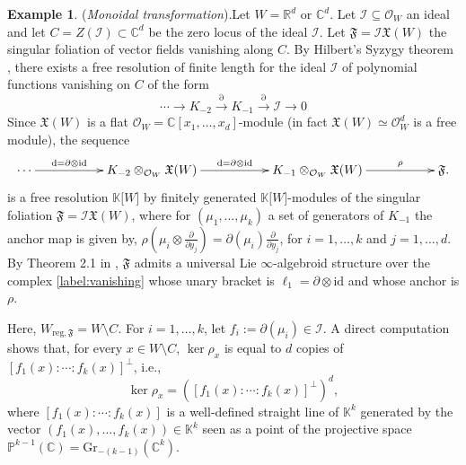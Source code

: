 \documentclass[10pt]{article}
\theoremstyle{plain}
\theoremstyle{definition}
\newtheorem{example}[lemma]{Example}
\theoremstyle{remark}
\newcommand{\dd}{\mathrm{d}}
\begin{document}
\begin{example}(\emph{Monoidal transformation}).\label{Monoidal}
Let $W=\mathbb R^d$ or $\mathbb C^d$. Let $\mathcal{I}\subseteq \mathcal{O}_W$ an ideal and let  $C=Z(\mathcal{I})\subset \mathbb C^d$ be the zero locus of the ideal $\mathcal I$. Let $\mathfrak{F}=\mathcal{I}\mathfrak{X}(W)$ the singular foliation of vector fields vanishing along $C$. By Hilbert’s Syzygy theorem \cite{EisenbudSyzygies},
there exists a free resolution {of finite length} for the ideal $\mathcal I$ of polynomial functions  vanishing on $C$  of the form\begin{equation}\label{label:vanishing1}
    \cdots \longrightarrow K_{-2}\stackrel{\partial}{\longrightarrow}K_{-1}\stackrel{\partial}{\longrightarrow}\mathcal{I}\longrightarrow 0
\end{equation} Since $\mathfrak{X}(W)$ is a flat $\mathcal O_W=\mathbb C[x_1, \ldots, x_d]$-module (in fact $\mathfrak X(W)\simeq \mathcal O_W^d$ is a free module),  the sequence \begin{equation}\label{label:vanishing}
\xymatrix{\cdots\ar[rr]^-{\dd=\partial\otimes\text{id}} & & K_{-2} \otimes_{\mathcal O_W} {\mathfrak{X}(W)} \ar^{\dd=\partial\otimes \text{id}}[rr]& & K_{-1}\otimes_{\mathcal O_W}\mathfrak{X}(W)\ar^-\rho[rr] & & \mathfrak{F}.
}\end{equation} is a free resolution $\mathbb{K}\mathbb[W]$ by finitely generated $\mathbb{K}\mathbb[W]$-modules of the singular foliation $\mathfrak{F}=\mathcal I\mathfrak{X}(W)$, where for $(\mu_1, \ldots, \mu_k)$ a set of generators of $K_{-1}$ the anchor map is given by, $\rho(\mu_i\otimes \frac{\partial}{\partial y_j})= \partial (\mu_i)\frac{\partial}{\partial y_j}$, for $i=1,\ldots,k$ and $j=1, \ldots, d$. By Theorem 2.1 in \cite{CLRL},  $\mathfrak{F}$ admits a universal Lie $\infty$-algebroid structure over the complex \eqref{label:vanishing} whose unary bracket is $\ell_1=\partial\otimes \mathrm{id}$ and whose anchor is $\rho$.


Here, $W_{\mathrm{reg},\mathfrak{F}}=W\setminus C$. For $i=1,\ldots,k$, let  $f_i:=\partial (\mu_i)\in \mathcal{I}$.  A direct computation shows that, for every $x\in W\setminus C$, $\ker \rho_x$ is equal to $d$ copies of  $[f_1(x):\cdots :f_k(x)]^\perp$, i.e., $$\ker \rho_x=\left([f_1(x):\cdots :f_k(x)]^\perp\right)^d,$$ where $[f_1(x):\cdots :f_k(x)]$ is a well-defined straight line  of $\mathbb{K}^{k}$ generated by the vector $(f_1(x),\ldots,f_k(x))\in \mathbb{K}^{k}$  seen as a point of the projective space $\mathbb P^{k-1}(\mathbb C)=\mathrm{Gr}_{-(k-1)}(\mathbb{C}^k)$.


\end{example}
\end{document}
